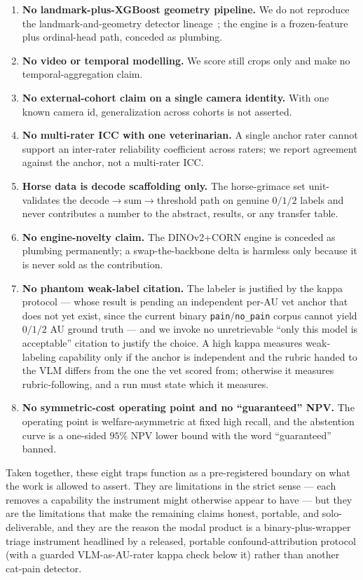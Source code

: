 \begin{enumerate}
  \item \textbf{No landmark-plus-XGBoost geometry pipeline.} We do not reproduce
  the landmark-and-geometry detector lineage~\cite{steagall2023}; the engine is a
  frozen-feature plus ordinal-head path, conceded as plumbing.
  \item \textbf{No video or temporal modelling.} We score still crops only and
  make no temporal-aggregation claim.
  \item \textbf{No external-cohort claim on a single camera identity.} With one
  known camera id, generalization across cohorts is not asserted.
  \item \textbf{No multi-rater ICC with one veterinarian.} A single anchor rater
  cannot support an inter-rater reliability coefficient across raters; we report
  agreement against the anchor, not a multi-rater ICC.
  \item \textbf{Horse data is decode scaffolding only.} The horse-grimace set
  unit-validates the decode$\rightarrow$sum$\rightarrow$threshold path on genuine
  $0/1/2$ labels and never contributes a number to the abstract, results, or any
  transfer table.
  \item \textbf{No engine-novelty claim.} The DINOv2+CORN engine is conceded as
  plumbing permanently; a swap-the-backbone delta is harmless only because it is
  never sold as the contribution.
  \item \textbf{No phantom weak-label citation.} The labeler is justified by the
  kappa protocol --- whose result is pending an independent per-AU vet anchor that
  does not yet exist, since the current binary \texttt{pain}/\texttt{no\_pain}
  corpus cannot yield $0/1/2$ AU ground truth --- and we invoke no unretrievable
  ``only this model is acceptable'' citation to justify the choice. A high kappa
  measures weak-labeling capability only if the anchor is independent and the
  rubric handed to the VLM differs from the one the vet scored from; otherwise it
  measures rubric-following, and a run must state which it measures.
  \item \textbf{No symmetric-cost operating point and no ``guaranteed'' NPV.} The
  operating point is welfare-asymmetric at fixed high recall, and the abstention
  curve is a one-sided $95\%$ NPV lower bound with the word ``guaranteed'' banned.
\end{enumerate}

Taken together, these eight traps function as a pre-registered boundary on what
the work is allowed to assert. They are limitations in the strict sense --- each
removes a capability the instrument might otherwise appear to have --- but they
are the limitations that make the remaining claims honest, portable, and
solo-deliverable, and they are the reason the modal product is a
binary-plus-wrapper triage instrument headlined by a released, portable
confound-attribution protocol (with a guarded VLM-as-AU-rater kappa check below it)
rather than another cat-pain detector.
